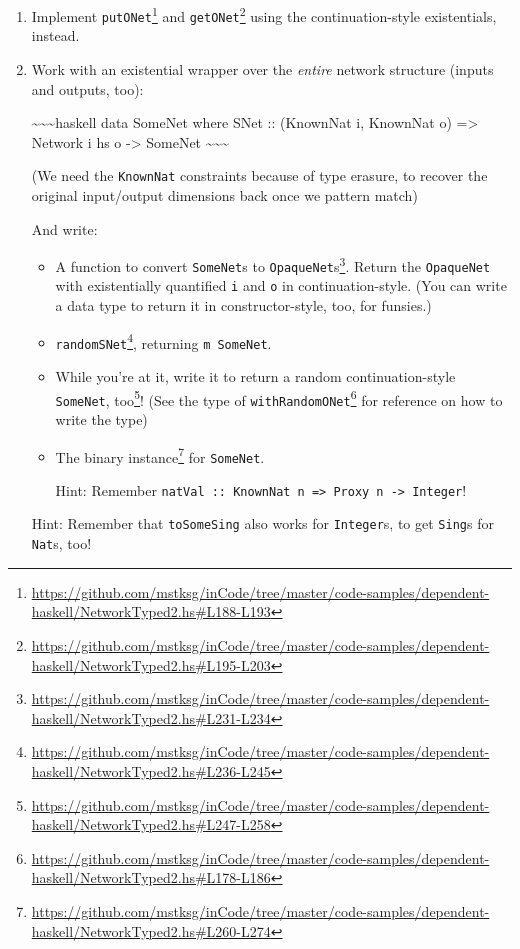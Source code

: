 \documentclass[]{article}
\renewcommand{\href}[2]{#2\footnote{\url{#1}}}
\begin{document}
\begin{enumerate}
\item
  Implement
  \href{https://github.com/mstksg/inCode/tree/master/code-samples/dependent-haskell/NetworkTyped2.hs\#L188-L193}{\texttt{putONet\textquotesingle{}}}
  and
  \href{https://github.com/mstksg/inCode/tree/master/code-samples/dependent-haskell/NetworkTyped2.hs\#L195-L203}{\texttt{getONet\textquotesingle{}}}
  using the continuation-style existentials, instead.
\item
  Work with an existential wrapper over the \emph{entire} network structure
  (inputs and outputs, too):

  \textasciitilde{}\textasciitilde{}\textasciitilde{}haskell data SomeNet where
  SNet :: (KnownNat i, KnownNat o) =\textgreater{} Network i hs o
  -\textgreater{} SomeNet \textasciitilde{}\textasciitilde{}\textasciitilde{}

  (We need the \texttt{KnownNat} constraints because of type erasure, to recover
  the original input/output dimensions back once we pattern match)

  And write:

  \begin{itemize}
  \item
    A function to
    \href{https://github.com/mstksg/inCode/tree/master/code-samples/dependent-haskell/NetworkTyped2.hs\#L231-L234}{convert
    \texttt{SomeNet}s to \texttt{OpaqueNet}s}. Return the \texttt{OpaqueNet}
    with existentially quantified \texttt{i} and \texttt{o} in
    continuation-style. (You can write a data type to return it in
    constructor-style, too, for funsies.)
  \item
    \href{https://github.com/mstksg/inCode/tree/master/code-samples/dependent-haskell/NetworkTyped2.hs\#L236-L245}{\texttt{randomSNet}},
    returning \texttt{m\ SomeNet}.
  \item
    While you're at it, write it to return
    \href{https://github.com/mstksg/inCode/tree/master/code-samples/dependent-haskell/NetworkTyped2.hs\#L247-L258}{a
    random continuation-style \texttt{SomeNet}, too}! (See the type of
    \href{https://github.com/mstksg/inCode/tree/master/code-samples/dependent-haskell/NetworkTyped2.hs\#L178-L186}{\texttt{withRandomONet\textquotesingle{}}}
    for reference on how to write the type)
  \item
    The
    \href{https://github.com/mstksg/inCode/tree/master/code-samples/dependent-haskell/NetworkTyped2.hs\#L260-L274}{binary
    instance} for \texttt{SomeNet}.

    Hint: Remember
    \texttt{natVal\ ::\ KnownNat\ n\ =\textgreater{}\ Proxy\ n\ -\textgreater{}\ Integer}!
  \end{itemize}

  Hint: Remember that \texttt{toSomeSing} also works for \texttt{Integer}s, to
  get \texttt{Sing}s for \texttt{Nat}s, too!
\end{enumerate}
\end{document}
